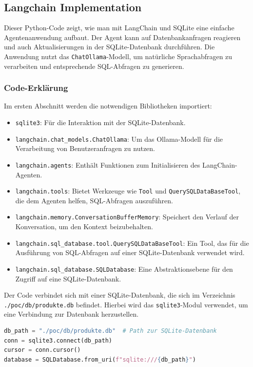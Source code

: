 \subsection{Langchain Implementation}
\label{sec:langchain-implementation}

Dieser Python-Code zeigt, wie man mit LangChain und SQLite eine einfache Agentenanwendung aufbaut. Der Agent kann auf Datenbankanfragen reagieren und auch Aktualisierungen in der SQLite-Datenbank durchführen. Die Anwendung nutzt das \texttt{ChatOllama}-Modell, um natürliche Sprachabfragen zu verarbeiten und entsprechende SQL-Abfragen zu generieren.

\subsubsection{Code-Erklärung}

Im ersten Abschnitt werden die notwendigen Bibliotheken importiert:
\begin{itemize}
    \item \texttt{sqlite3}: Für die Interaktion mit der SQLite-Datenbank.
    \item \texttt{langchain.chat\_models.ChatOllama}: Um das Ollama-Modell für die Verarbeitung von Benutzeranfragen zu nutzen.
    \item \texttt{langchain.agents}: Enthält Funktionen zum Initialisieren des LangChain-Agenten.
    \item \texttt{langchain.tools}: Bietet Werkzeuge wie \texttt{Tool} und \texttt{QuerySQLDataBaseTool}, die dem Agenten helfen, SQL-Abfragen auszuführen.
    \item \texttt{langchain.memory.ConversationBufferMemory}: Speichert den Verlauf der Konversation, um den Kontext beizubehalten.
    \item \texttt{langchain.sql\_database.tool.QuerySQLDataBaseTool}: Ein Tool, das für die Ausführung von SQL-Abfragen auf einer SQLite-Datenbank verwendet wird.
    \item \texttt{langchain.sql\_database.SQLDatabase}: Eine Abstraktionsebene für den Zugriff auf eine SQLite-Datenbank.
\end{itemize}

Der Code verbindet sich mit einer SQLite-Datenbank, die sich im Verzeichnis \texttt{./poc/db/produkte.db} befindet. Hierbei wird das \texttt{sqlite3}-Modul verwendet, um eine Verbindung zur Datenbank herzustellen.

\begin{lstlisting}[language=Python]
db_path = "./poc/db/produkte.db"  # Path zur SQLite-Datenbank
conn = sqlite3.connect(db_path)
cursor = conn.cursor()
database = SQLDatabase.from_uri(f"sqlite:///{db_path}")
\end{lstlisting}

